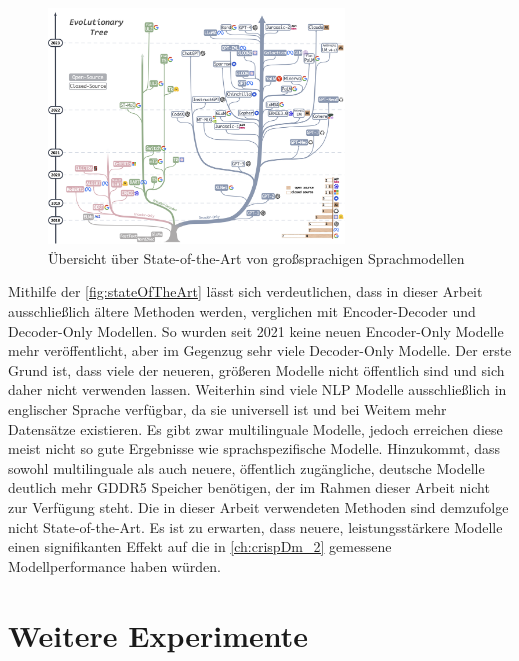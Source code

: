 
\begin{figure}[H]
    \centering
    \includegraphics[width=0.7\textwidth]{data/images/tree.png}
    \caption{Übersicht über State-of-the-Art von großsprachigen Sprachmodellen \autocite{yang_harnessing_2023}} \label{fig:stateOfTheArt}
\end{figure}

Mithilfe der \autoref{fig:stateOfTheArt} lässt sich verdeutlichen, dass in dieser Arbeit ausschließlich ältere Methoden werden, verglichen mit Encoder-Decoder und Decoder-Only Modellen. So wurden seit \num{2021} keine neuen Encoder-Only Modelle mehr veröffentlicht, aber im Gegenzug sehr viele Decoder-Only Modelle. Der erste Grund ist, dass viele der neueren, größeren Modelle nicht öffentlich sind und sich daher nicht verwenden lassen. Weiterhin sind viele \ac{NLP} Modelle ausschließlich in englischer Sprache verfügbar, da sie universell ist und bei Weitem mehr Datensätze existieren. Es gibt zwar multilinguale Modelle, jedoch erreichen diese meist nicht so gute Ergebnisse wie sprachspezifische Modelle. Hinzukommt, dass sowohl multilinguale als auch neuere, öffentlich zugängliche, deutsche Modelle deutlich mehr \ac{GDDR5} Speicher benötigen, der im Rahmen dieser Arbeit nicht zur Verfügung steht. Die in dieser Arbeit verwendeten Methoden sind demzufolge nicht State-of-the-Art. Es ist zu erwarten, dass neuere, leistungsstärkere Modelle einen signifikanten Effekt auf die in \autoref{ch:crispDm_2} gemessene Modellperformance haben würden.

\section{Weitere Experimente} \label{subsec:furtherExperiments}

